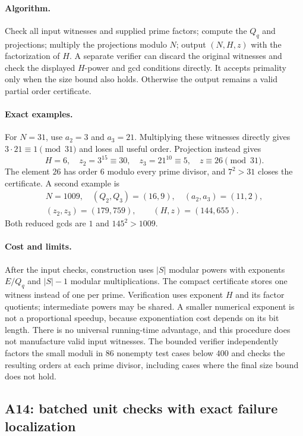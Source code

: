\documentclass[11pt,a4paper]{article}
\theoremstyle{definition}\newtheorem{definition}[theorem]{Definition}
\theoremstyle{remark}\newtheorem{remark}[theorem]{Remark}
\begin{document}
\paragraph{Algorithm.}
Check all input witnesses and supplied prime factors; compute the
$Q_q$ and projections; multiply the projections modulo $N$; output
$(N,H,z)$ with the factorization of $H$.  A separate verifier can discard
the original witnesses and check the displayed $H$-power and gcd
conditions directly.  It accepts primality only when the size bound also
holds.  Otherwise the output remains a valid partial order certificate.

\paragraph{Exact examples.}
For $N=31$, use $a_2=3$ and $a_3=21$.  Multiplying these witnesses directly
gives $3\cdot21\equiv1\pmod{31}$ and loses all useful order.  Projection
instead gives
\[
 H=6,\quad z_2=3^{15}\equiv30,\quad z_3=21^{10}\equiv5,
 \quad z\equiv26\pmod{31}.
\]
The element $26$ has order $6$ modulo every prime divisor, and
$7^2>31$ closes the certificate.  A second example is
\[
\begin{gathered}
 N=1009,\quad (Q_2,Q_3)=(16,9),\quad(a_2,a_3)=(11,2),\\
 (z_2,z_3)=(179,759),\qquad(H,z)=(144,655).
\end{gathered}
\]
Both reduced gcds are $1$ and $145^2>1009$.

\paragraph{Cost and limits.}
After the input checks, construction uses $|S|$ modular powers with
exponents $E/Q_q$ and $|S|-1$ modular multiplications.  The compact
certificate stores one witness instead of one per prime.  Verification
uses exponent $H$ and its factor quotients; intermediate powers may be
shared.  A smaller numerical exponent is not a proportional speedup,
because exponentiation cost depends on its bit length.  There is no
universal running-time advantage, and this procedure does not manufacture
valid input witnesses.  The bounded verifier independently factors the
small moduli in 86 nonempty test cases below $400$ and checks the resulting
orders at each prime divisor, including cases where the final size bound
does not hold.

\subsection{A14: batched unit checks with exact failure localization}
\label{alg:A14}
\end{document}
